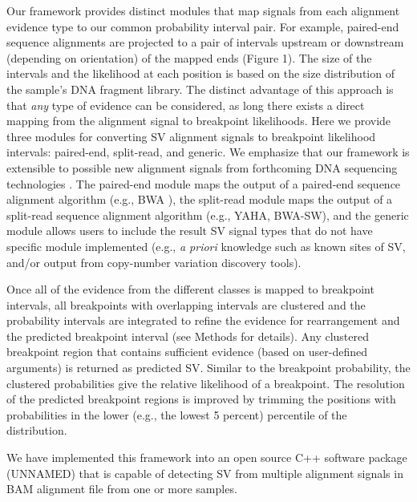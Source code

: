 \documentclass[11pt]{article}
\begin{document}

Our framework provides distinct modules that map signals from each alignment 
evidence type to our common probability interval pair.  For example, paired-end 
sequence alignments are projected to a pair of intervals upstream or downstream 
(depending on orientation) of the mapped ends (Figure 1).  The size of the 
intervals and the likelihood at each position is based on the size distribution
of the sample's DNA fragment library.  The distinct advantage of this approach
is that \emph{any} type of evidence can be considered, as long there exists
a direct mapping from the alignment signal to breakpoint likelihoods.
Here we provide three modules for converting SV alignment signals to breakpoint
likelihood intervals: paired-end, split-read, and generic.  We emphasize that
our framework is extensible to possible new alignment signals from forthcoming
DNA sequencing technologies \cite{OxfordNanopore}. The paired-end module maps 
the output of a paired-end sequence alignment algorithm 
(e.g., BWA \cite{Li2009}), the split-read module maps the output of a 
split-read sequence alignment algorithm (e.g., YAHA\cite{Faust2012}, 
BWA-SW\cite{Li2010}), and the generic module allows users to include the result 
SV signal types that do not have specific module implemented (e.g., 
\emph{a priori} knowledge such as known sites of SV, and/or output from 
copy-number variation discovery tools).

Once all of the evidence from the different classes is mapped to breakpoint
intervals, all breakpoints with overlapping intervals are clustered and 
the probability intervals are integrated to refine the evidence for 
rearrangement and the predicted breakpoint interval (see Methods for details).  
Any clustered breakpoint region that contains sufficient evidence (based on 
user-defined arguments) is returned as predicted SV.  
Similar to the breakpoint probability, the clustered probabilities give the 
relative likelihood of a breakpoint.  The resolution of the predicted breakpoint
regions is improved by trimming the positions with probabilities 
in the lower (e.g., the lowest 5 percent) percentile of the distribution.

We have implemented this framework into an open source C++ software package 
(UNNAMED) that is capable of detecting SV from multiple alignment signals in 
BAM alignment file from one or more samples.
\end{document}
